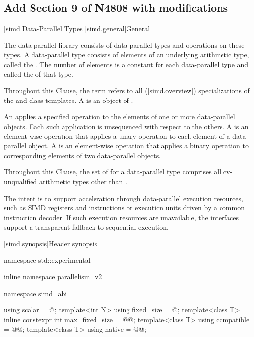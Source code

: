 \subsection{Add Section 9 of N4808 with modifications}
\begin{wgText}
\setcounter{WGClause}{26}
\setcounter{WGSubSection}{8}
[simd]{Data-Parallel Types}
[simd.general]{General}

\pnum
The data-parallel library consists of data-parallel types and operations on these types. A data-parallel type consists of elements of an underlying arithmetic type, called the . The number of elements is a constant for each data-parallel type and called the  of that type.

\pnum
Throughout this Clause, the term  refers to all  (\ref{simd.overview}) specializations of the  and  class templates. A  is an object of .

\pnum
An  applies a specified operation to the elements of one or more data-parallel objects. Each such application is unsequenced with respect to the others. A  is an element-wise operation that applies a unary operation to each element of a data-parallel object. A  is an element-wise operation that applies a binary operation to corresponding elements of two data-parallel objects.

\pnum
Throughout this Clause, the set of  for a data-parallel type comprises all cv-unqualified arithmetic types other than .

\pnum
\begin{note}
The intent is to support acceleration through data-parallel execution resources, such as SIMD registers and instructions or execution units driven by a common instruction decoder. If such execution resources are unavailable, the interfaces support a transparent fallback to sequential execution.
\end{note}

[simd.synopsis]{Header  synopsis}

\begin{codeblock}
namespace std::experimental {
inline namespace parallelism_v2 {
  namespace simd_abi {
    using scalar = @\seebelow@;
    template<int N> using fixed_size = @\seebelow@;
    template<class T> inline constexpr int max_fixed_size = @@;
    template<class T> using compatible = @@;
    template<class T> using native = @@;

}}}
\end{codeblock}
\end{wgText}
